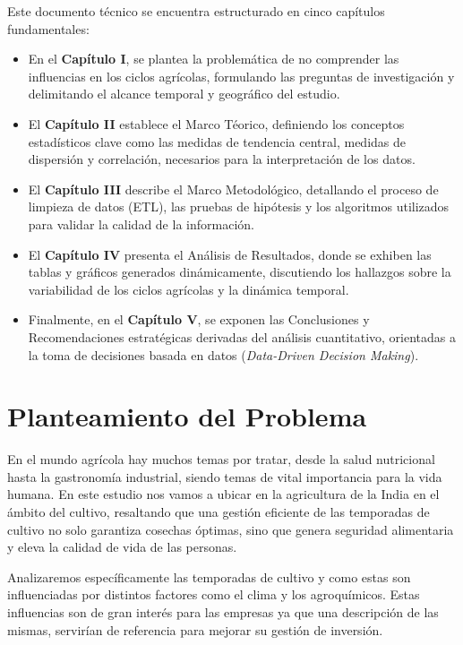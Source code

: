 \documentclass[oneside,11pt]{Latex/Classes/PhDthesisPSnPDF}
\begin{document}
Este documento técnico se encuentra estructurado en cinco capítulos
fundamentales:

\begin{itemize}
    \item En el \textbf{Capítulo I}, se plantea la problemática de no comprender las influencias en los ciclos agrícolas, formulando las preguntas de investigación y delimitando el alcance temporal y geográfico del estudio.
    
    \item El \textbf{Capítulo II} establece el Marco Téorico, definiendo los conceptos estadísticos clave como las medidas de tendencia central, medidas de dispersión y correlación, necesarios para la interpretación de los datos.
    
    \item El \textbf{Capítulo III} describe el Marco Metodológico, detallando el proceso de limpieza de datos (ETL), las pruebas de hipótesis y los algoritmos utilizados para validar la calidad de la información.
    
    \item El \textbf{Capítulo IV} presenta el Análisis de Resultados, donde se exhiben las tablas y gráficos generados dinámicamente, discutiendo los hallazgos sobre la variabilidad de los ciclos agrícolas y la dinámica temporal.
    
    \item Finalmente, en el \textbf{Capítulo V}, se exponen las Conclusiones y Recomendaciones estratégicas derivadas del análisis cuantitativo, orientadas a la toma de decisiones basada en datos (\textit{Data-Driven Decision Making}).
\end{itemize}

\chapter{Planteamiento del Problema}

En el mundo agrícola hay muchos temas por tratar, desde la salud
nutricional hasta la gastronomía industrial, siendo temas de vital
importancia para la vida humana. En este estudio nos vamos a ubicar en
la agricultura de la India en el ámbito del cultivo, resaltando que una
gestión eficiente de las temporadas de cultivo no solo garantiza
cosechas óptimas, sino que genera seguridad alimentaria y eleva la
calidad de vida de las personas.

Analizaremos específicamente las temporadas de cultivo y como estas son
influenciadas por distintos factores como el clima y los agroquímicos.
Estas influencias son de gran interés para las empresas ya que una
descripción de las mismas, servirían de referencia para mejorar su
gestión de inversión.
\end{document}
